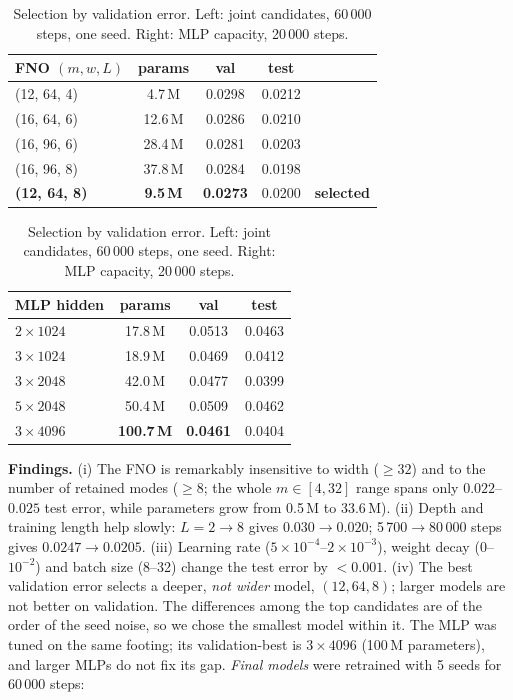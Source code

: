 \documentclass[11pt,a4paper]{article}
\begin{document}
\begin{table}[H]\centering\small
\caption{Selection by validation error. Left: joint candidates, 60\,000 steps, one seed. Right: MLP capacity, 20\,000 steps.}\label{tab:arch}
\setlength{\tabcolsep}{4pt}\begin{tabular}{lcccc}\toprule
FNO $(m,w,L)$ & params & val & test & \\\midrule
(12, 64, 4) & 4.7\,M & 0.0298 & 0.0212 & \\
(16, 64, 6) & 12.6\,M & 0.0286 & 0.0210 & \\
(16, 96, 6) & 28.4\,M & 0.0281 & 0.0203 & \\
(16, 96, 8) & 37.8\,M & 0.0284 & 0.0198 & \\
\textbf{(12, 64, 8)} & \textbf{9.5\,M} & \textbf{0.0273} & 0.0200 & \textbf{selected}\\\bottomrule
\end{tabular}\hspace{0.8em}
\begin{tabular}{lccc}\toprule
MLP hidden & params & val & test\\\midrule
$2\times1024$ & 17.8\,M & 0.0513 & 0.0463\\
$3\times1024$ & 18.9\,M & 0.0469 & 0.0412\\
$3\times2048$ & 42.0\,M & 0.0477 & 0.0399\\
$5\times2048$ & 50.4\,M & 0.0509 & 0.0462\\
\textbf{$3\times4096$} & \textbf{100.7\,M} & \textbf{0.0461} & 0.0404\\\bottomrule
\end{tabular}\end{table}

\textbf{Findings.} (i) The FNO is remarkably insensitive to width ($\ge32$) and to the number of retained modes ($\ge 8$; the whole $m\in[4,32]$ range spans only $0.022$--$0.025$ test error, while parameters grow from 0.5\,M to 33.6\,M). (ii) Depth and training length help slowly: $L=2\to8$ gives $0.030\to0.020$; 5\,700$\to$80\,000 steps gives $0.0247\to0.0205$. (iii) Learning rate ($5\!\times\!10^{-4}$--$2\!\times\!10^{-3}$), weight decay ($0$--$10^{-2}$) and batch size (8--32) change the test error by $<0.001$. (iv) The best validation error selects a deeper, \emph{not wider} model, $(12,64,8)$; larger models are not better on validation. The differences among the top candidates are of the order of the seed noise, so we chose the smallest model within it. The MLP was tuned on the same footing; its validation-best is $3\times4096$ (100\,M parameters), and larger MLPs do not fix its gap. \emph{Final models} were retrained with 5 seeds for 60\,000 steps:
\end{document}
